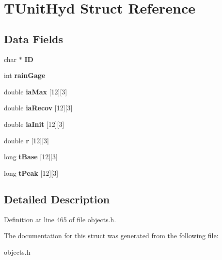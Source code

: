 \hypertarget{struct_t_unit_hyd}{}\section{T\+Unit\+Hyd Struct Reference}
\label{struct_t_unit_hyd}
\subsection*{Data Fields}
\begin{DoxyCompactItemize}
\item 
\mbox{\label{struct_t_unit_hyd_a63756a4a33a8c806e584babb52907653}} 
char $\ast$ {\bfseries ID}
\item 
\mbox{\label{struct_t_unit_hyd_a95c0fc844020f60c27f4f447de7eb03f}} 
int {\bfseries rain\+Gage}
\item 
\mbox{\label{struct_t_unit_hyd_a7e7fc19e4d9ee3119b95c79850bd6080}} 
double {\bfseries ia\+Max} \mbox{[}12\mbox{]}\mbox{[}3\mbox{]}
\item 
\mbox{\label{struct_t_unit_hyd_a814660b0dafea17b1d3f5a03b8c01258}} 
double {\bfseries ia\+Recov} \mbox{[}12\mbox{]}\mbox{[}3\mbox{]}
\item 
\mbox{\label{struct_t_unit_hyd_afdd6480a08386479c044d54d9ae252f0}} 
double {\bfseries ia\+Init} \mbox{[}12\mbox{]}\mbox{[}3\mbox{]}
\item 
\mbox{\label{struct_t_unit_hyd_ae61d6ae5ebde52d91600a6e3b2ff520f}} 
double {\bfseries r} \mbox{[}12\mbox{]}\mbox{[}3\mbox{]}
\item 
\mbox{\label{struct_t_unit_hyd_a829998bc388f8b5b32905e7b4904bf33}} 
long {\bfseries t\+Base} \mbox{[}12\mbox{]}\mbox{[}3\mbox{]}
\item 
\mbox{\label{struct_t_unit_hyd_adfc80188eff0280a22f059afafadcfc4}} 
long {\bfseries t\+Peak} \mbox{[}12\mbox{]}\mbox{[}3\mbox{]}
\end{DoxyCompactItemize}


\subsection{Detailed Description}


Definition at line 465 of file objects.\+h.



The documentation for this struct was generated from the following file\+:\begin{DoxyCompactItemize}
\item 
objects.\+h\end{DoxyCompactItemize}
